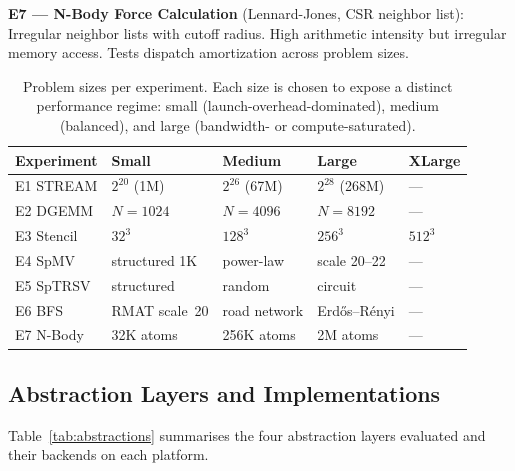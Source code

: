 \textbf{E7 --- N-Body Force Calculation} (Lennard-Jones, CSR neighbor list):
Irregular neighbor lists with cutoff radius. High arithmetic intensity but
irregular memory access. Tests dispatch amortization across problem sizes.

\begin{table}[h]
\centering
\caption{Problem sizes per experiment. Each size is chosen to expose a distinct
performance regime: small (launch-overhead-dominated), medium (balanced), and
large (bandwidth- or compute-saturated).}
\label{tab:problem-sizes}
\begin{tabular}{lllll}
\hline
\textbf{Experiment} & \textbf{Small} & \textbf{Medium} & \textbf{Large}
& \textbf{XLarge} \\
\hline
E1 STREAM   & $2^{20}$ (1M)    & $2^{26}$ (67M)    & $2^{28}$ (268M)  & --- \\
E2 DGEMM    & $N = 1024$       & $N = 4096$        & $N = 8192$       & --- \\
E3 Stencil  & $32^3$           & $128^3$           & $256^3$          & $512^3$ \\
E4 SpMV     & structured 1K    & power-law         & scale 20--22     & --- \\
E5 SpTRSV   & structured       & random            & circuit          & --- \\
E6 BFS      & RMAT scale~20    & road network      & Erd\H{o}s--R\'enyi & --- \\
E7 N-Body   & 32K atoms        & 256K atoms        & 2M atoms         & --- \\
\hline
\end{tabular}
\end{table}

\subsection{Abstraction Layers and Implementations}
\label{subsec:abstractions-method}

Table~\ref{tab:abstractions} summarises the four abstraction layers evaluated
and their backends on each platform.

